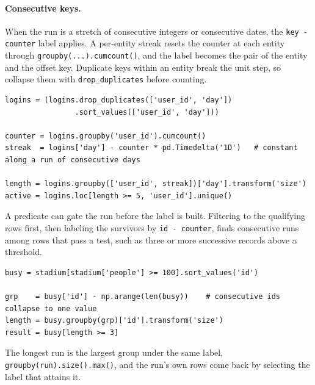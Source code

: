 \vspace{-1ex}

\paragraph{Consecutive keys.} When the run is a stretch of consecutive integers or consecutive dates, the \texttt{key - counter} label applies. A per-entity streak resets the counter at each entity through \texttt{groupby(...).cumcount()}, and the label becomes the pair of the entity and the offset key. Duplicate keys within an entity break the unit step, so collapse them with \texttt{drop\_duplicates} before counting.

\begin{lstlisting}[style=python, caption={Users active five or more consecutive days}]
logins = (logins.drop_duplicates(['user_id', 'day'])
                .sort_values(['user_id', 'day']))

counter = logins.groupby('user_id').cumcount()
streak  = logins['day'] - counter * pd.Timedelta('1D')   # constant along a run of consecutive days

length = logins.groupby(['user_id', streak])['day'].transform('size')
active = logins.loc[length >= 5, 'user_id'].unique()
\end{lstlisting}

\vspace{-1ex}

A predicate can gate the run before the label is built. Filtering to the qualifying rows first, then labeling the survivors by \texttt{id - counter}, finds consecutive runs among rows that pass a test, such as three or more successive records above a threshold.

\begin{lstlisting}[style=python, caption={Three or more consecutive ids clearing a threshold}]
busy = stadium[stadium['people'] >= 100].sort_values('id')

grp    = busy['id'] - np.arange(len(busy))    # consecutive ids collapse to one value
length = busy.groupby(grp)['id'].transform('size')
result = busy[length >= 3]
\end{lstlisting}

\vspace{-1ex}

The longest run is the largest group under the same label, \texttt{groupby(run).size().max()}, and the run's own rows come back by selecting the label that attains it.
